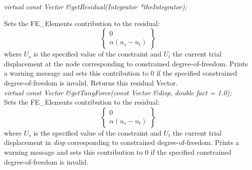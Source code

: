 {\em virtual const Vector \&getResidual(Integrator *theIntegrator);} 

Sets the FE\_Elements contribution to the residual:
\[ \left\{ \begin{array}{c} 0 \\ \alpha(u_s - u_t) \end{array} \right\} \]
where $U_s$ is the specified value of the
constraint and $U_t$ the current trial displacement at the node
corresponding to constrained degree-of-freedom. Prints a warning
message and sets this contribution to $0$ if the specified constrained
degree-of-freedom is invalid. Returns this residual Vector.\\


{\em virtual const Vector \&getTangForce(const Vector \&disp, double
fact = 1.0);    }\\
Sets the FE\_Elements contribution to the residual:
\[ \left\{ \begin{array}{c} 0 \\ \alpha(u_s - u_t) \end{array} \right\} \]
where $U_s$ is the specified value of the
constraint and $U_t$ the current trial displacement in {\em disp}
corresponding to constrained degree-of-freedom. Prints a warning
message and sets this contribution to $0$ if the specified constrained
degree-of-freedom is invalid. \\ 










